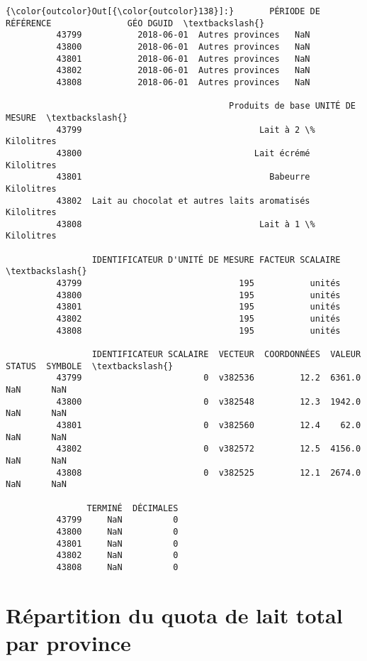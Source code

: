 \documentclass[11pt]{article}
\begin{document}
\begin{Verbatim}[commandchars=\\\{\}]
{\color{outcolor}Out[{\color{outcolor}138}]:}       PÉRIODE DE RÉFÉRENCE               GÉO DGUID  \textbackslash{}
          43799           2018-06-01  Autres provinces   NaN   
          43800           2018-06-01  Autres provinces   NaN   
          43801           2018-06-01  Autres provinces   NaN   
          43802           2018-06-01  Autres provinces   NaN   
          43808           2018-06-01  Autres provinces   NaN   
          
                                            Produits de base UNITÉ DE MESURE  \textbackslash{}
          43799                                   Lait à 2 \%      Kilolitres   
          43800                                  Lait écrémé      Kilolitres   
          43801                                     Babeurre      Kilolitres   
          43802  Lait au chocolat et autres laits aromatisés      Kilolitres   
          43808                                   Lait à 1 \%      Kilolitres   
          
                 IDENTIFICATEUR D'UNITÉ DE MESURE FACTEUR SCALAIRE  \textbackslash{}
          43799                               195           unités   
          43800                               195           unités   
          43801                               195           unités   
          43802                               195           unités   
          43808                               195           unités   
          
                 IDENTIFICATEUR SCALAIRE  VECTEUR  COORDONNÉES  VALEUR STATUS  SYMBOLE  \textbackslash{}
          43799                        0  v382536         12.2  6361.0    NaN      NaN   
          43800                        0  v382548         12.3  1942.0    NaN      NaN   
          43801                        0  v382560         12.4    62.0    NaN      NaN   
          43802                        0  v382572         12.5  4156.0    NaN      NaN   
          43808                        0  v382525         12.1  2674.0    NaN      NaN   
          
                TERMINÉ  DÉCIMALES  
          43799     NaN          0  
          43800     NaN          0  
          43801     NaN          0  
          43802     NaN          0  
          43808     NaN          0  
\end{Verbatim}
            
    \section{Répartition du quota de lait total par
province}\label{ruxe9partition-du-quota-de-lait-total-par-province}
\end{document}
